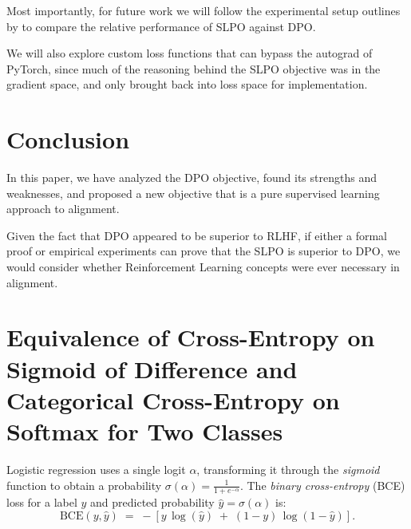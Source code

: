 \documentclass[twoside,11pt]{article}
\begin{document}
Most importantly, for future work we will follow the
experimental setup outlines by \cite{Rafailov} to compare the 
relative performance of SLPO against DPO.

We will also explore custom loss functions that can bypass the autograd
of PyTorch, since much of the reasoning behind the SLPO objective
was in the gradient space, and only brought back into loss
space for implementation. 

\section{Conclusion}

In this paper, we have analyzed the DPO objective, found 
its strengths and weaknesses, and proposed a new objective
that is a pure supervised learning approach to alignment.

Given the fact that DPO appeared to be superior to RLHF, if
either a formal proof or empirical experiments can prove that 
the SLPO is superior to DPO, we would consider whether
Reinforcement Learning concepts were ever necessary in alignment. 




\newpage

\appendix



\section{Equivalence of Cross-Entropy on Sigmoid of Difference
and Categorical Cross-Entropy on Softmax for Two Classes}

\label{app:ce-of-diff-same-as-softmax}

Logistic regression uses 
a single logit \(\alpha\), transforming it through the \emph{sigmoid} function to obtain 
a probability \(\sigma(\alpha) = \frac{1}{1 + e^{-\alpha}} \). The \emph{binary cross-entropy} 
(BCE) loss for a label $y$ and predicted probability \(\hat{y} = \sigma(\alpha)\) is:
\[
  \text{BCE}(y, \hat{y})
  \;=\;
  - \left[
      y \,\log(\hat{y})
      \;+\;
      (1 - y)\,\log (1 - \hat{y})
    \right].
\]
\end{document}
